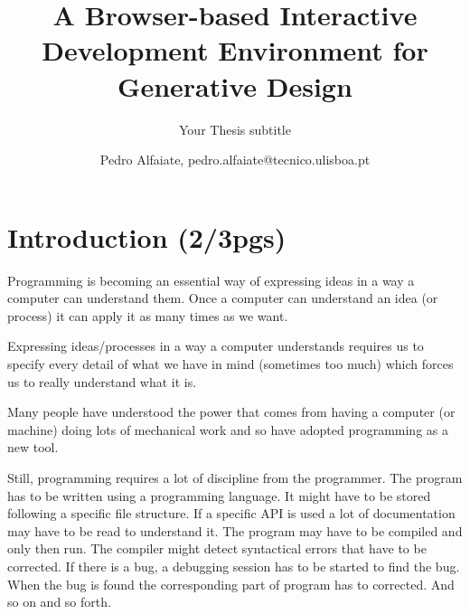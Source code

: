 \documentclass{./llncs2e/llncs}
\begin{document}
\title{A Browser-based Interactive Development Environment for Generative Design}

\subtitle{Your Thesis subtitle}
\author{Pedro Alfaiate, pedro.alfaiate@tecnico.ulisboa.pt}

\maketitle

\begin{abstract}

\end{abstract}
\begin{keywords}

\end{keywords}
\section{Introduction (2/3pgs)}
	Programming is becoming an essential way of expressing ideas in a way a computer can understand them.
	Once a computer can understand an idea (or process) it can apply it as many times as we want.

	Expressing ideas/processes in a way a computer understands requires us to specify every detail of what we have in mind (sometimes too much) which forces us to really understand what it is.

	Many people have understood the power that comes from having a computer (or machine) doing lots of mechanical work and so have adopted programming as a new tool.

	Still, programming requires a lot of discipline from the programmer.
	The program has to be written using a programming language.
	It might have to be stored following a specific file structure.
	If a specific API is used a lot of documentation may have to be read to understand it.
	The program may have to be compiled and only then run.
	The compiler might detect syntactical errors that have to be corrected.
	If there is a bug, a debugging session has to be started to find the bug.
	When the bug is found the corresponding part of program has to corrected.
	And so on and so forth.
\end{document}
